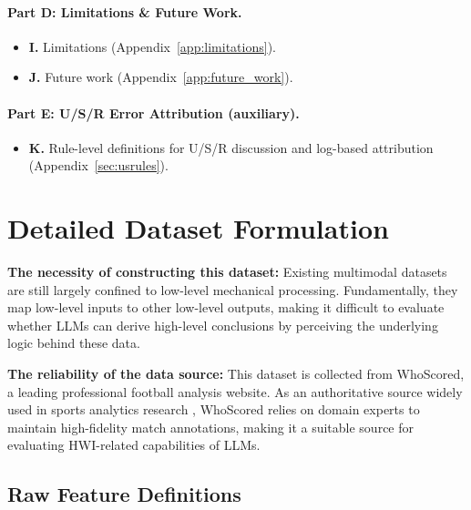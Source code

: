 \paragraph{Part D: Limitations \& Future Work.}
\begin{itemize}
    \item \textbf{I.} Limitations (Appendix~\ref{app:limitations}).
    \item \textbf{J.} Future work (Appendix~\ref{app:future_work}).
\end{itemize}

\paragraph{Part E: U/S/R Error Attribution (auxiliary).}
\begin{itemize}
    \item \textbf{K.} Rule-level definitions for U/S/R discussion and log-based attribution (Appendix~\ref{sec:usrules}).
\end{itemize}


\section{Detailed Dataset Formulation}
\label{app:dataset_formulation}

\textbf{The necessity of constructing this dataset:} Existing multimodal datasets are still largely confined to low-level mechanical processing. Fundamentally, they map low-level inputs to other low-level outputs, making it difficult to evaluate whether LLMs can derive high-level conclusions by perceiving the underlying logic behind these data.

\textbf{The reliability of the data source:} This dataset is collected from WhoScored, a leading professional football analysis website. As an authoritative source widely used in sports analytics research \cite{li2022emergent,liu2025can,mahowald2024dissociating}, WhoScored relies on domain experts to maintain high-fidelity match annotations, making it a suitable source for evaluating HWI-related capabilities of LLMs.

\subsection{Raw Feature Definitions}
\label{app:raw_features}

